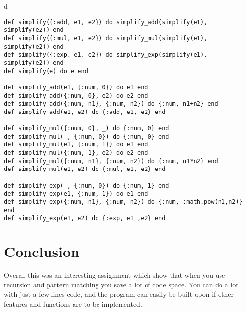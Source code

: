 d\documentclass[a4paper,11pt]{article}
\begin{document}
\begin{verbatim}
def simplify({:add, e1, e2}) do simplify_add(simplify(e1), simplify(e2)) end
def simplify({:mul, e1, e2}) do simplify_mul(simplify(e1), simplify(e2)) end
def simplify({:exp, e1, e2}) do simplify_exp(simplify(e1), simplify(e2)) end
def simplify(e) do e end

def simplify_add(e1, {:num, 0}) do e1 end
def simplify_add({:num, 0}, e2) do e2 end
def simplify_add({:num, n1}, {:num, n2}) do {:num, n1+n2} end
def simplify_add(e1, e2) do {:add, e1, e2} end

def simplify_mul({:num, 0}, _) do {:num, 0} end
def simplify_mul(_, {:num, 0}) do {:num, 0} end
def simplify_mul(e1, {:num, 1}) do e1 end
def simplify_mul({:num, 1}, e2) do e2 end
def simplify_mul({:num, n1}, {:num, n2}) do {:num, n1*n2} end
def simplify_mul(e1, e2) do {:mul, e1, e2} end

def simplify_exp(_, {:num, 0}) do {:num, 1} end
def simplify_exp(e1, {:num, 1}) do e1 end
def simplify_exp({:num, n1}, {:num, n2}) do {:num, :math.pow(n1,n2)} end
def simplify_exp(e1, e2) do {:exp, e1 ,e2} end
\end{verbatim}

\section{Conclusion}
Overall this was an interesting assignment which show that when you use recursion and pattern matching you save a lot of code space. You can do a lot with just a few lines code, and the program can easily be built upon if other features and functions are to be implemented.
\end{document}
